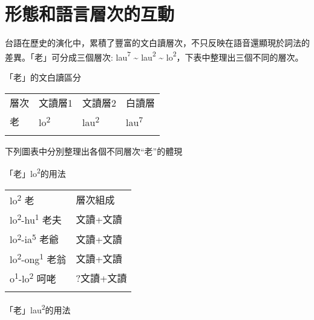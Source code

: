 \section{\rmfamily 形態和語言層次的互動}

\textrm{台語在歷史的演化中，累積了豐富的文白讀層次，不只反映在語音還顯現於詞法的差異。「老」可分成三個層次: lau}\textrm{\textsuperscript{7}} \textrm{{\textasciitilde} lau}\textrm{\textsuperscript{2}} \textrm{{\textasciitilde} lo}\textrm{\textsuperscript{2}}，\textrm{下表中整理出三個不同的層次。}

 \textrm{「老」}的文白讀區分

\tablefirsthead{}

\tabletail{}
\tablelasttail{}
\begin{tabularx}{\textwidth}{XXXX}
\lsptoprule

 層次 & 文讀層1 & 文讀層2 & 白讀層\\
 老 & {\sffamily \textrm{lo}\textrm{\textsuperscript{2}}} & {\sffamily \textrm{lau}\textrm{\textsuperscript{2}}} & {\sffamily \textrm{lau}\textrm{\textsuperscript{7}}}\\
\lspbottomrule
\end{tabularx}
\rmfamily
下列圖表中分別整理出各個不同層次``老''的體現

 \textrm{「老」lo}\textrm{\textsuperscript{2}}的用法

\tablefirsthead{}

\tabletail{}
\tablelasttail{}
\begin{tabularx}{\textwidth}{XX}
\lsptoprule

{\sffamily \textrm{lo}\textrm{\textsuperscript{2}} \textrm{老}} & 層次組成\\
{\sffamily \textrm{lo}\textrm{\textsuperscript{2}}\textrm{{}-hu}\textrm{\textsuperscript{1}} \textrm{老夫}} & 文讀+文讀\\
{\sffamily \textrm{lo}\textrm{\textsuperscript{2}}\textrm{{}-ia}\textrm{\textsuperscript{5}} \textrm{老爺}} & 文讀+文讀\\
{\sffamily \textrm{lo}\textrm{\textsuperscript{2}}\textrm{{}-ong}\textrm{\textsuperscript{1}} \textrm{老翁}} & 文讀+文讀\\
{\sffamily \textrm{o}\textrm{\textsuperscript{1}}\textrm{{}-lo}\textrm{\textsuperscript{2}} \textrm{呵咾} } & ?文讀+文讀\\
\lspbottomrule
\end{tabularx}
 \textrm{「老」lau}\textrm{\textsuperscript{2}}的用法

\tablefirsthead{}


